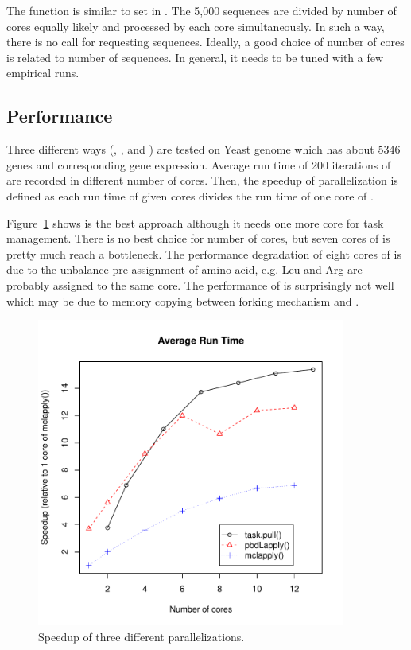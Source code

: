 The function  is similar to set 
in . The 5,000 sequences are divided by number of cores equally
likely and processed by each core simultaneously. In such a way, there is no
call for requesting sequences. Ideally, a good choice of number of cores
is related to number of sequences. In general, it needs to be tuned with a
few empirical runs.


\subsection[Performance]{Performance}
\label{sec:performance}

Three different ways (, , and
) are tested on Yeast genome which has about 5346 genes
and corresponding gene expression. Average run time of 200 iterations of
 are recorded in different number of cores. Then, the
speedup of parallelization is defined as each run time of given cores divides
the run time of one core of .

Figure~\ref{fig:speedup} shows  is the best approach
although it needs one more core for task management. There is no best
choice for number of cores, but seven cores of  is pretty
much reach a bottleneck. The performance degradation of eight cores
of  is due to the unbalance pre-assignment of amino acid,
e.g. Leu and Arg are probably assigned to the same core.
The performance of  is surprisingly not well which may be
due to memory copying between forking mechanism and
.

\begin{figure}[ht]
\centering
\includegraphics[width=4in]{cubfits-include/figure/avg_run_time}
\caption{Speedup of three different parallelizations.}
\label{fig:speedup}
\end{figure}
